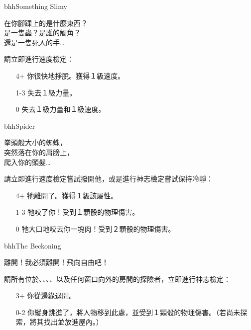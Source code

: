 \linebreak[0]%
\begin{EventCard}{bhh}{Something Slimy}
  \begin{CardStory}
    在你腳踝上的是什麼東西？\\
    是一隻蟲？是誰的觸角？\\
    還是一隻死人的手…
  \end{CardStory}
  請立即進行速度檢定：
  \begin{itemize}
    \item[4+] 你很快地掙脫。獲得１級速度。
    \item[1-3] 失去１級力量。
    \item[0] 失去１級力量和１級速度。
  \end{itemize}
\end{EventCard}%
\linebreak[0]%
\begin{EventCard}{bhh}{Spider}
  \begin{CardStory}
    拳頭般大小的蜘蛛，\\
    突然落在你的肩膀上，\\
    爬入你的頭髮…
  \end{CardStory}
  請立即進行速度檢定嘗試撥開他，或是進行神志檢定嘗試保持冷靜：
  \begin{itemize}
    \item[4+] 牠離開了。獲得１級該屬性。
    \item[1-3] 牠咬了你！受到１顆骰的物理傷害。
    \item[0] 牠大口地咬去你一塊肉！受到２顆骰的物理傷害。
  \end{itemize}
\end{EventCard}%
\linebreak[0]%
\begin{EventCard}{bhh}{The Beckoning}
  \begin{CardStory}
    離開！我必須離開！飛向自由吧！
  \end{CardStory}
  請所有位於、、、、以及任何窗口向外的房間的探險者，立即進行神志檢定：
  \begin{itemize}
    \item[3+] 你從邊緣退開。
    \item[0-2] 你縱身跳進了，將人物移到此處，並受到１顆骰的物理傷害。（若尚未探索，將其找出並放進屋內。）
  \end{itemize}
\end{EventCard}%
\linebreak[0]%
